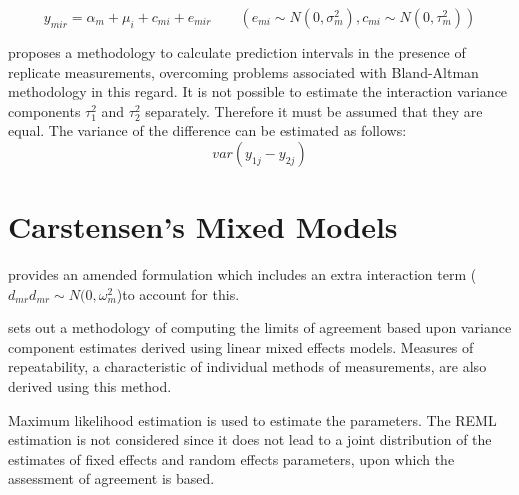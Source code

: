 \documentclass[12pt, a4paper]{report}
\theoremstyle{plain}
\theoremstyle{definition}
\theoremstyle{remark}
\begin{document}
\begin{equation}
y_{mir}  = \alpha_{m} + \mu_{i} + c_{mi} + e_{mir} \qquad ( e_{mi}
\sim N(0,\sigma^{2}_{m}), c_{mi} \sim N(0,\tau^{2}_{m}))
\end{equation}

\citet{BXC2008} proposes a methodology to calculate prediction
intervals in the presence of replicate measurements, overcoming
problems associated with Bland-Altman methodology in this regard.
It is not possible to estimate the interaction variance components
$\tau^{2}_{1}$ and $\tau^{2}_{2}$ separately. Therefore it must be
assumed that they are equal. The variance of the difference can be
estimated as follows:
\begin{equation}
var(y_{1j}-y_{2j})
\end{equation}

\newpage
\section{Carstensen's Mixed Models}


\citet{BXC2004} provides an amended formulation which includes an extra interaction
term ($d_{mr} d_{mr} \sim N(0,\omega^{2}_{m}$)to account for this.

\citet{BXC2008} sets out a methodology of computing the limits of
agreement based upon variance component estimates derived using
linear mixed effects models. Measures of repeatability, a
characteristic of individual methods of measurements, are also
derived using this method.





Maximum likelihood estimation is used to estimate the parameters.
The REML estimation is not considered since it does not lead to a
joint distribution of the estimates of fixed effects and random
effects parameters, upon which the assessment of agreement is
based.
\end{document}
